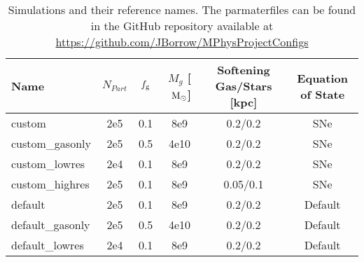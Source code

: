 \begin{table}
    \centering

    \begin{tabular}{l|c|c|c|c|c}

    Name & $N_{Part}$ & $f_\mathrm{g}$ & $M_g$ [$~\mathrm{M}_{\odot}$] & Softening Gas/Stars [kpc] & Equation of State \\
    \hline
    custom & 2e5 & 0.1 & 8e9 & 0.2/0.2 & SNe \\
    custom\_gasonly & 2e5 & 0.5 & 4e10 & 0.2/0.2 & SNe \\
    custom\_lowres & 2e4 & 0.1 & 8e9 & 0.2/0.2 & SNe \\
    custom\_highres & 2e5 & 0.1 & 8e9 & 0.05/0.1 & SNe \\
    default & 2e5 & 0.1 & 8e9 & 0.2/0.2 & Default \\
    default\_gasonly & 2e5 & 0.5 & 4e10 & 0.2/0.2 & Default \\
    default\_lowres & 2e4 & 0.1 & 8e9 & 0.2/0.2 & Default \\

    \end{tabular}

    \caption{Simulations and their reference names. The parmaterfiles can be found in the GitHub repository available at \protect\url{https://github.com/JBorrow/MPhysProjectConfigs}}
    \label{tab:sims}
\end{table}
